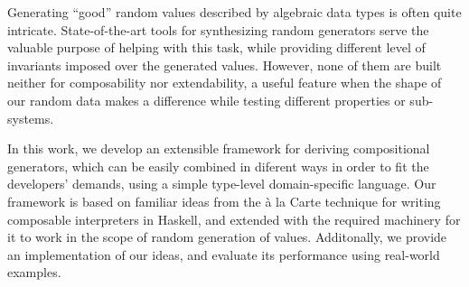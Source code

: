 Generating ``good'' random values described by algebraic data types is often
quite intricate.
%
State-of-the-art tools for synthesizing random generators serve the valuable
purpose of helping with this task, while providing different level of invariants
imposed over the generated values.
%
However, none of them are built neither for composability nor extendability, a
useful feature when the shape of our random data makes a difference while
testing different properties or sub-systems.
%


In this work, we develop an extensible framework for deriving compositional
generators, which can be easily combined in diferent ways in order to fit the
developers' demands, using a simple type-level domain-specific language.
%
Our framework is based on familiar ideas from the \`a la Carte technique for
writing composable interpreters in Haskell, and extended with the required
machinery for it to work in the scope of random generation of values.
%
Additonally, we provide an implementation of our ideas, and evaluate its
performance using real-world examples.
